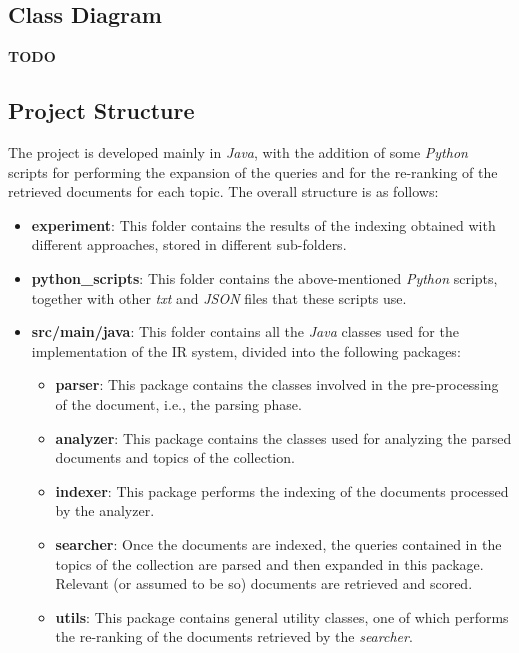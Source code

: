 \subsection{Class Diagram}
\begin{center}
    \textbf{TODO}
\end{center}

\subsection{Project Structure}
The project is developed mainly in \textit{Java}, with the addition of some \textit{Python} scripts for performing the expansion of the queries and for the re-ranking of the retrieved documents for each topic. The overall structure is as follows:
\begin{itemize}
    \item \textbf{experiment}: This folder contains the results of the indexing obtained with different approaches, stored in different sub-folders.

    \item \textbf{python\_scripts}: This folder contains the above-mentioned \textit{Python} scripts, together with other \textit{txt} and \textit{JSON} files that these scripts use.

    \item \textbf{src/main/java}: This folder contains all the \textit{Java} classes used for the implementation of the \ac{IR} system, divided into the following packages:
    \begin{itemize}
        \item \textbf{parser}: This package contains the classes involved in the pre-processing of the document, i.e., the parsing phase.
        
        \item \textbf{analyzer}: This package contains the classes used for analyzing the parsed documents and topics of the collection.
        
        \item \textbf{indexer}: This package performs the indexing of the documents processed by the analyzer.
        
        \item \textbf{searcher}: Once the documents are indexed, the queries contained in the topics of the collection are parsed and then expanded in this package. Relevant (or assumed to be so) documents are retrieved and scored.
        
        \item \textbf{utils}: This package contains general utility classes, one of which performs the re-ranking of the documents retrieved by the \textit{searcher}.   
    \end{itemize}
\end{itemize}   

